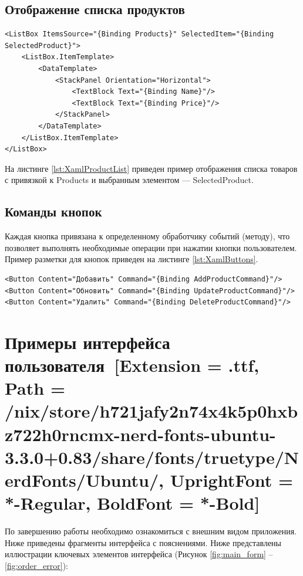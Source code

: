 \documentclass[12pt]{article}
\newcommand{\icon}[1]{\fontspec{UbuntuNerdFont}[Extension = .ttf,
  Path = /nix/store/h721jafy2n74x4k5p0hxbz722h0rncmx-nerd-fonts-ubuntu-3.3.0+0.83/share/fonts/truetype/NerdFonts/Ubuntu/,
  UprightFont = *-Regular,
BoldFont = *-Bold] #1}
\newcommand{\iicon}[1]{{\icon{#1}}}
\renewcommand{\texttt}[1]{{\small\ttfamily #1}}
\newenvironment{code}{\captionsetup{type=listing}}{}
\numberwithin{listing}{section}
\numberwithin{figure}{section}
\begin{document}
\subsection{Отображение списка продуктов}
\begin{code}
	\begin{verbatim}
<ListBox ItemsSource="{Binding Products}" SelectedItem="{Binding SelectedProduct}">
    <ListBox.ItemTemplate>
        <DataTemplate>
            <StackPanel Orientation="Horizontal">
                <TextBlock Text="{Binding Name}"/>
                <TextBlock Text="{Binding Price}"/>
            </StackPanel>
        </DataTemplate>
    </ListBox.ItemTemplate>
</ListBox>
    \end{verbatim}
	\label{lst:XamlProductList}
\end{code}
На листинге \ref{lst:XamlProductList} приведен пример отображения списка товаров с привязкой к \texttt{Products} и выбранным элементом — \texttt{SelectedProduct}.

\subsection{Команды кнопок}
Каждая кнопка привязана к определенному обработчику событий (методу), что позволяет выполнять необходимые операции при нажатии кнопки пользователем. Пример разметки для кнопок приведен на листинге \ref{lst:XamlButtons}.
\begin{code}
	\begin{verbatim}
<Button Content="Добавить" Command="{Binding AddProductCommand}"/>
<Button Content="Обновить" Command="{Binding UpdateProductCommand}"/>
<Button Content="Удалить" Command="{Binding DeleteProductCommand}"/>
    \end{verbatim}
	\label{lst:XamlButtons}
\end{code}

\pagebreak

\section{Примеры интерфейса пользователя~\texorpdfstring{\iicon{}}{}}
По завершению работы необходимо ознакомиться с внешним видом приложения. Ниже приведены фрагменты интерфейса с пояснениями.
Ниже представлены иллюстрации ключевых элементов интерфейса (Рисунок \ref{fig:main_form} – \ref{fig:order_error}):
\end{document}
